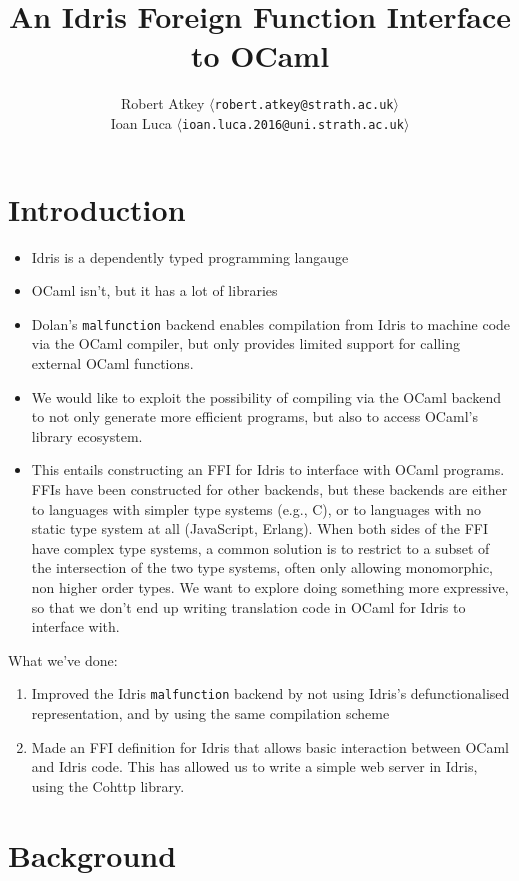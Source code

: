 \documentclass[a4paper,twocolumn]{article}
\title{An Idris Foreign Function Interface to OCaml}
\author{Robert Atkey  $\langle$\texttt{robert.atkey@strath.ac.uk}$\rangle$ \\
  Ioan Luca $\langle$\texttt{ioan.luca.2016@uni.strath.ac.uk}$\rangle$}
\date{}
\newcommand{\malfunction}{\texttt{malfunction}}
\begin{document}
\maketitle

\section{Introduction}



\begin{itemize}
\item Idris is a dependently typed programming langauge
\item OCaml isn't, but it has a lot of libraries
\item Dolan's \texttt{malfunction} backend enables compilation from
  Idris to machine code via the OCaml compiler, but only provides
  limited support for calling external OCaml functions.
\item We would like to exploit the possibility of compiling via the
  OCaml backend to not only generate more efficient programs, but also
  to access OCaml's library ecosystem.
\item This entails constructing an FFI for Idris to interface with
  OCaml programs. FFIs have been constructed for other backends, but
  these backends are either to languages with simpler type systems
  (e.g., C), or to languages with no static type system at all
  (JavaScript, Erlang). When both sides of the FFI have complex type
  systems, a common solution is to restrict to a subset of the
  intersection of the two type systems, often only allowing
  monomorphic, non higher order types. We want to explore doing
  something more expressive, so that we don't end up writing
  translation code in OCaml for Idris to interface with.
\end{itemize}

What we've done:
\begin{enumerate}
\item Improved the Idris \malfunction{} backend by not using Idris's
  defunctionalised representation, and by using the same compilation
  scheme
\item Made an FFI definition for Idris that allows basic interaction
  between OCaml and Idris code. This has allowed us to write a simple
  web server in Idris, using the Cohttp library.
\end{enumerate}

\section{Background}
\end{document}
